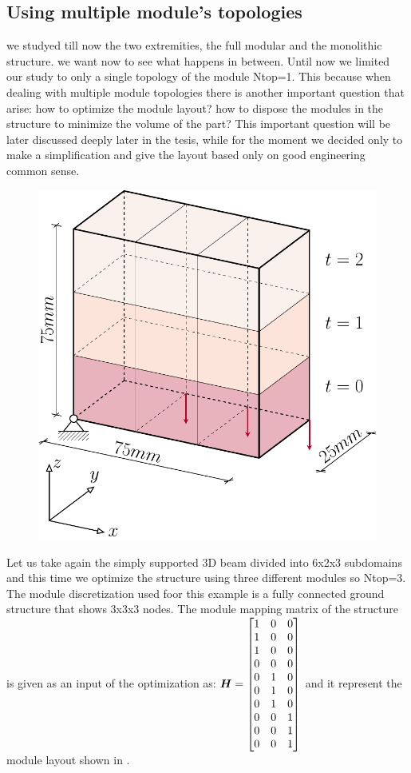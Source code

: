 \subsection{Using multiple module's topologies}
we studyed till now the two extremities, the full modular and the monolithic structure. we want now to see what happens in between. Until now we limited our study to only a single topology of the module Ntop=1. This because when dealing with multiple module topologies there is another important question that arise: how to optimize the module layout? how to dispose the modules in the structure to minimize the volume of the part? This important question will be later discussed deeply later in the tesis, while for the moment we decided only to make a simplification and give the layout based only on good engineering common sense.

\begin{figure}
    \centering
    \includegraphics[width=0.6\linewidth]{figures/05_cellular_opt/00_mutiple_bc/supported_3D_symm.pdf}
    \caption{}
    \label{fig:05_mutiple_bc}
\end{figure}

Let us take again the simply supported 3D beam divided into 6x2x3 subdomains and this time we optimize the structure using three different modules so Ntop=3. The module discretization used foor this example is a fully connected ground structure that shows 3x3x3 nodes. The module mapping matrix of the structure is given as an input of the optimization as:
$\bm{H}=
\begin{bmatrix}
    1 & 0 & 0\\
    1 & 0 & 0\\
    1 & 0 & 0\\
    0 & 0 & 0\\
    0 & 1 & 0\\
    0 & 1 & 0\\
    0 & 1 & 0\\
    0 & 0 & 1\\
    0 & 0 & 1\\
    0 & 0 & 1\\
\end{bmatrix}$
and it represent the module layout shown in .

